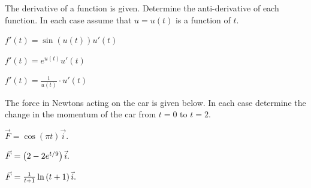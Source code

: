 \begin{problem}
  \clearpage

\item The derivative of a function is given. Determine the
  anti-derivative of each function. In each case assume that $u=u(t)$
  is a function of $t$. 
  \begin{subproblem}
  \item $f'(t) = \sin(u(t)) u'(t)$
    \vfill
  \item $f'(t) = e^{u(t)} u'(t)$
    \vfill
  \item $f'(t) = \frac{1}{u(t)} \cdot u'(t)$
    \vfill
  \end{subproblem}

  \clearpage

\item The force in Newtons acting on the car is given below. In each
  case determine the change in the momentum of the car from $t=0$ to
  $t=2$. 
  \begin{subproblem}
    \item $\vec{F} = \cos(\pi t) \vec{i}.$
      \vfill
    \item $\vec{F} = \left( 2 - 2 e^{t/9} \right) \vec{i}.$
      \vfill
    \item $\vec{F} = \frac{1}{t+1} \ln\left( t+1 \right) \vec{i}.$
      \vfill
  \end{subproblem}

\end{problem}

\postClass

